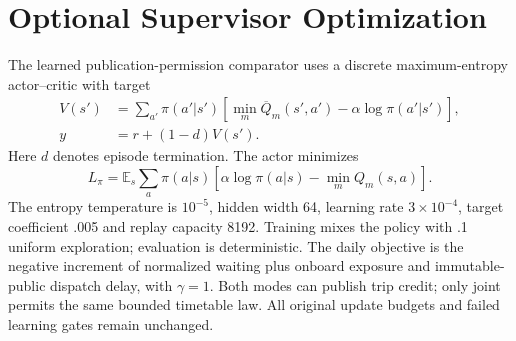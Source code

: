 \section{Optional Supervisor Optimization}
The learned publication-permission comparator uses a discrete maximum-entropy
actor--critic with target
\begin{align}
V(s')&=\sum_{a'}\pi(a'|s')\left[\min_m\overline Q_m(s',a')-\alpha\log\pi(a'|s')\right],\\
y&=r+(1-d)V(s').
\end{align}
Here $d$ denotes episode termination. The actor minimizes
\begin{equation}
L_\pi=\mathbb E_s\sum_a\pi(a|s)\left[\alpha\log\pi(a|s)-\min_m Q_m(s,a)\right].
\end{equation}
The entropy temperature is $10^{-5}$, hidden width 64, learning rate
$3\times10^{-4}$, target coefficient .005 and replay capacity 8192. Training
mixes the policy with .1 uniform exploration; evaluation is deterministic.
The daily objective is the negative increment of normalized waiting plus
onboard exposure and immutable-public dispatch delay, with $\gamma=1$.
Both modes can publish trip credit; only joint permits the same bounded
timetable law. All original update budgets and failed learning gates remain
unchanged.
